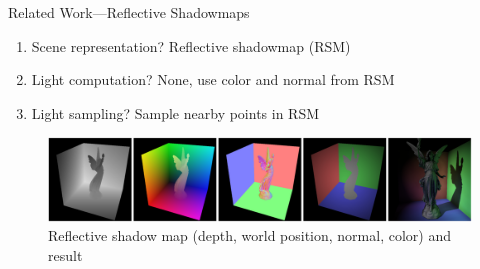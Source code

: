 \documentclass[10pt]{beamer}
\begin{document}
{
\begin{frame}{Related Work---Reflective Shadowmaps}
  \begin{enumerate}
    \item Scene representation? \alert{Reflective shadowmap (RSM)}%
    \item Light computation? \alert{None, use color and normal from RSM}%
    \item Light sampling? \alert{Sample nearby points in RSM} %
  \end{enumerate}

  \begin{figure}
    \includegraphics[width=\textwidth]{rsm}
    \caption*{Reflective shadow map (depth, world position, normal, color) and result}
  \end{figure}

\end{frame}}
\end{document}
